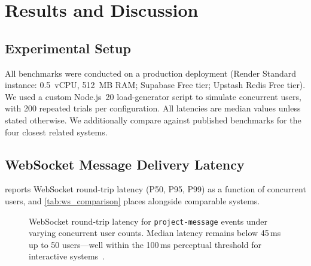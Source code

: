 \section{Results and Discussion}
\label{sec:results}

\subsection{Experimental Setup}

All benchmarks were conducted on a production deployment (Render Standard
instance: 0.5~vCPU, 512~MB RAM; Supabase Free tier; Upstash Redis Free
tier). We used a custom Node.js~20 load-generator script to simulate
concurrent users, with 200 repeated trials per configuration. All latencies
are median values unless stated otherwise. We additionally compare against
published benchmarks for the four closest related systems.

\subsection{WebSocket Message Delivery Latency}
\label{sub:ws_results}

 reports WebSocket round-trip latency (P50, P95,
P99) as a function of concurrent users, and \cref{tab:ws_comparison} places
\echoray{} alongside comparable systems.

\begin{figure}[H]
  \centering
  \caption{WebSocket round-trip latency for \texttt{project-message} events
    under varying concurrent user counts. Median latency remains below
    45\,ms up to 50 users---well within the 100\,ms perceptual threshold
    for interactive systems~\cite{miller1968response}.}
  \label{fig:ws_latency_full}
\end{figure}


